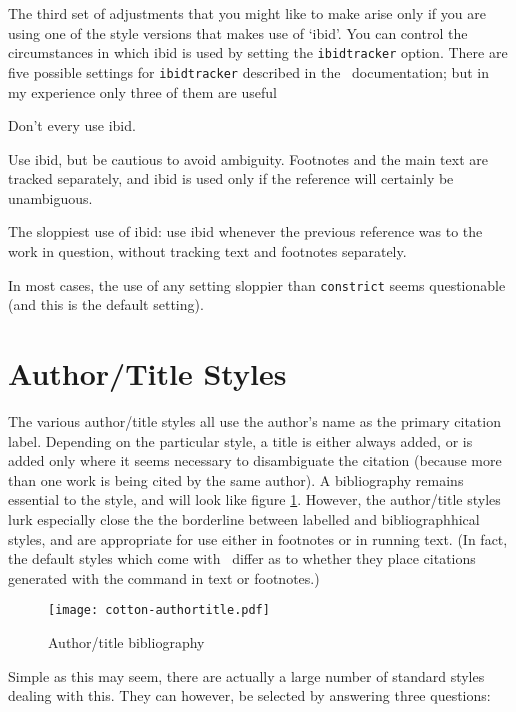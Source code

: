 The third set of adjustments that you might like to make arise only if
you are using one of the style versions that makes use of `ibid'. You
can control the circumstances in which ibid is used by setting the
\verb|ibidtracker| option. There are five possible settings for
\verb|ibidtracker| described in the \biblatex\ documentation; but in
my experience only three of them are useful
\begin{description}[font=\ttfamily\upshape\bfseries]
\item[ibidtracker=false] Don't every use ibid.
\item[ibidtracker=constrict] Use ibid, but be cautious to avoid
  ambiguity. Footnotes and the main text are tracked separately, and
  ibid is used only if the reference will certainly be unambiguous.
\item[ibidtracker=true] The sloppiest use of ibid: use ibid whenever
  the previous reference was to the work in question, without tracking
  text and footnotes separately.
\end{description}
In most cases, the use of any setting sloppier than \texttt{constrict}
seems questionable (and this is the default setting).




\section{Author/Title Styles}

The various author/title styles all use the author's name as the
primary citation label. Depending on the particular style, a title is
either always added, or is added only where it seems necessary to
disambiguate the citation (because more than one work is being cited
by the same author). A bibliography remains essential to the style,
and will look like figure
\ref{example:bibliography:authortitle}. However, the author/title
styles lurk especially close the the borderline between labelled and
bibliographhical styles, and are appropriate for use either in
footnotes or in running text. (In fact, the default styles which come
with \biblatex\ differ as to whether they place citations generated
with the  command in text or footnotes.)

\begin{figure}
\caption{Author/title bibliography\label{example:bibliography:authortitle}}
\texttt{[image: cotton-authortitle.pdf]}
\end{figure}

Simple as this may seem, there are actually a large number of standard
styles dealing with this. They can however, be selected by answering
three questions:


